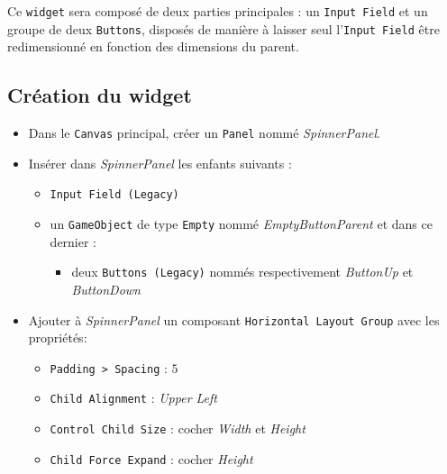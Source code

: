 \documentclass[a4paper,10pt]{article}
\newenvironment{solution}%
{\begin{tcolorbox}[breakable,colback=red!5!white,colframe=red!75!black,title=Solution]}%
{\end{tcolorbox}}
\begin{document}
\ifversionenseignant
\begin{solution}
Ce \texttt{widget} sera composé de deux parties principales : un \texttt{Input Field} et un groupe de deux \texttt{Buttons}, disposés de manière à  laisser seul l'\texttt{Input Field} être redimensionné en fonction des dimensions du parent.	

\subsection{Création du widget}
\begin{itemize}
	\item Dans le \texttt{Canvas} principal, créer un \texttt{Panel} nommé \textit{SpinnerPanel}.
	\item Insérer dans \textit{SpinnerPanel} les enfants suivants :
	\begin{itemize}
		\item \texttt{Input Field (Legacy)}
		\item un \texttt{GameObject} de type \texttt{Empty} nommé \textit{EmptyButtonParent} et dans ce dernier :
		\begin{itemize}
			\item deux \texttt{Buttons (Legacy)} nommés respectivement \textit{ButtonUp} et \textit{ButtonDown}
		\end{itemize}	
	\end{itemize}	
	
	\item Ajouter à \textit{SpinnerPanel} un composant \texttt{Horizontal Layout Group} avec les propriétés:
	\begin{itemize}
		\item \texttt{Padding > Spacing} : $5$
		\item \texttt{Child Alignment} : \textit{Upper Left}
		\item \texttt{Control Child Size} : cocher \textit{Width} et \textit{Height}
		\item \texttt{Child Force Expand} : cocher \textit{Height}
	\end{itemize}	


\end{itemize}
\end{solution}
\end{document}
